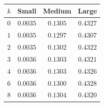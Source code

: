 \begin{tabular}{lccc}
\toprule
$k$ & Small & Medium & Large \\
\midrule
$0$ & $0.0035$ & $0.1305$ & $0.4327$ \\
$1$ & $0.0035$ & $0.1297$ & $0.4307$ \\
$2$ & $0.0035$ & $0.1302$ & $0.4322$ \\
$3$ & $0.0036$ & $0.1303$ & $0.4321$ \\
$4$ & $0.0036$ & $0.1303$ & $0.4326$ \\
$6$ & $0.0036$ & $0.1300$ & $0.4328$ \\
$8$ & $0.0036$ & $0.1304$ & $0.4320$ \\
\bottomrule
\end{tabular}
